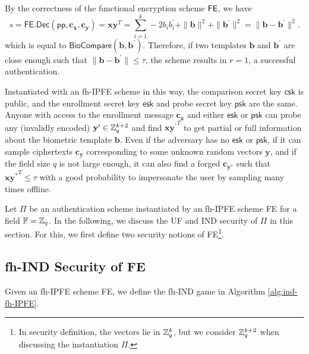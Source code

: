 By the correctness of the functional encryption scheme $\sf FE$, we have
\[
	s = \textsf{FE.Dec}(\textsf{pp}, \mathbf{c_x}, \mathbf{c_y}) =  \mathbf{x} \mathbf{y}^T = \sum_{i=1}^k -2b_ib_i^\prime + \|\mathbf{b}\|^2 + \|\mathbf{b}^\prime\|^2 = \| \mathbf{b} - \mathbf{b}^\prime \|^2.
\]
which is equal to $\textsf{BioCompare}(\mathbf{b}, \mathbf{b}^\prime)$. Therefore, if two templates $\mathbf{b}$ and $\mathbf{b}^\prime$ are close enough such that $\|\mathbf{b} - \mathbf{b}^\prime\| \leq \tau$, the scheme results in $r = 1$, a successful authentication.

Instantiated with an fh-IPFE scheme in this way, the comparison secret key $\textsf{csk}$ is public, and the enrollment secret key $\textsf{esk}$ and probe secret key $\textsf{psk}$ are the same. Anyone with access to the enrollment message $\mathbf{c_x}$ and either $\textsf{esk}$ or $\textsf{psk}$ can probe any (invalidly encoded) $\mathbf{y}^{\prime} \in \mathbb{Z}_q^{k+2}$ and find $\mathbf{x} {\mathbf{y}^\prime}^T$ to get partial or full information about the biometric template $\mathbf{b}$. Even if the adversary has no $\textsf{esk}$ or $\textsf{psk}$, if it can sample ciphertexts $\mathbf{c_{y}}$ corresponding to some unknown random vectors $\mathbf{y}$, and if the field size $q$ is not large enough, it can also find a forged $\mathbf{c_{y^*}}$ such that $\mathbf{x}\mathbf{y^*}^T \leq \tau$ with a good probability to impersonate the user by sampling many times offline.


Let $\Pi$ be an authentication scheme instantiated by an fh-IPFE scheme \textsf{FE} for a field $\mathbb{F} = \mathbb{Z}_q$. In the following, we discuss the UF and IND security of $\Pi$ in this section. For this, we first define two security notions of \textsf{FE}\footnote{In security definition, the vectors lie in $\mathbb{Z}_q^k$, but we consider $\mathbb{Z}_q^{k+2}$ when discussing the instantiation $\Pi$.}.


\subsection{fh-IND Security of \textsf{FE}}

Given an fh-IPFE scheme \textsf{FE}, we define the \textsf{fh-IND} game \cite{cryptoeprint:2016/440} in Algorithm \ref{alg:ind-fh-IPFE}.

